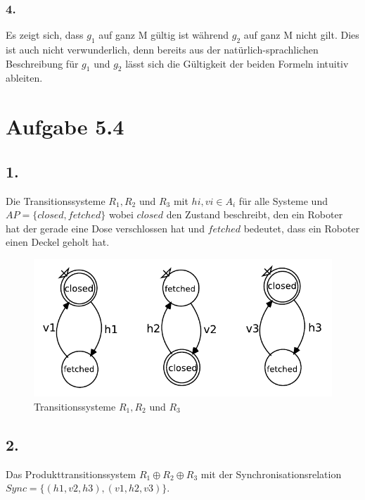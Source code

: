 \documentclass[12pt, paper=a4]{article}
\begin{document}
\newpage
\subsubsection*{4.}
Es zeigt sich, dass $g_{1}$ auf ganz M gültig ist während $g_{2}$ auf ganz M nicht gilt.
Dies ist auch nicht verwunderlich, denn bereits aus der natürlich-sprachlichen Beschreibung für $g_{1}$ und $g_{2}$ lässt sich die Gültigkeit der beiden Formeln intuitiv ableiten.


\section*{Aufgabe 5.4}
\subsection*{1.}
Die Transitionssysteme $R_1, R_2$ und $R_3$ mit $hi, vi \in A_i$ für alle Systeme und $AP = \{closed, fetched\}$ wobei $closed$ den Zustand beschreibt, den ein Roboter hat der gerade eine Dose verschlossen hat und $fetched$ bedeutet, dass ein Roboter einen Deckel geholt hat.\\

\begin{figure}[h!]
\centering
\includegraphics[scale=0.8]{r1r2r3.pdf}
\caption{Transitionssysteme $R_1, R_2$ und $R_3$}
\end{figure}

\subsection*{2.}
Das Produkttransitionssystem $R_1 \oplus R_2 \oplus R_3$ mit der Synchronisationsrelation $Sync = \{(h1, v2, h3), (v1, h2, v3)\}$.\\
\end{document}
